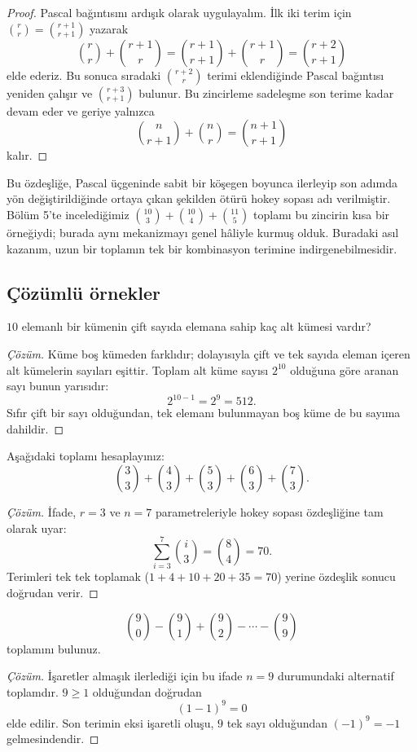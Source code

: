 \begin{proof}
Pascal bağıntısını ardışık olarak uygulayalım. İlk iki terim için $\binom{r}{r}=\binom{r+1}{r+1}$ yazarak
\[
\binom{r}{r}+\binom{r+1}{r}
=\binom{r+1}{r+1}+\binom{r+1}{r}
=\binom{r+2}{r+1}
\]
elde ederiz. Bu sonuca sıradaki $\binom{r+2}{r}$ terimi eklendiğinde Pascal bağıntısı yeniden çalışır ve $\binom{r+3}{r+1}$ bulunur. Bu zincirleme sadeleşme son terime kadar devam eder ve geriye yalnızca
\[
\binom{n}{r+1}+\binom{n}{r}=\binom{n+1}{r+1}
\]
kalır.
\end{proof}

Bu özdeşliğe, Pascal üçgeninde sabit bir köşegen boyunca ilerleyip son adımda yön değiştirildiğinde ortaya çıkan şekilden ötürü hokey sopası adı verilmiştir. Bölüm 5'te incelediğimiz $\binom{10}{3}+\binom{10}{4}+\binom{11}{5}$ toplamı bu zincirin kısa bir örneğiydi; burada aynı mekanizmayı genel hâliyle kurmuş olduk. Buradaki asıl kazanım, uzun bir toplamın tek bir kombinasyon terimine indirgenebilmesidir.

\subsection{Çözümlü örnekler}

\begin{example}
$10$ elemanlı bir kümenin çift sayıda elemana sahip kaç alt kümesi vardır?
\end{example}
\begin{proof}[Çözüm]
Küme boş kümeden farklıdır; dolayısıyla çift ve tek sayıda eleman içeren alt kümelerin sayıları eşittir. Toplam alt küme sayısı $2^{10}$ olduğuna göre aranan sayı bunun yarısıdır:
\[
2^{10-1}=2^9=512.
\]
Sıfır çift bir sayı olduğundan, tek elemanı bulunmayan boş küme de bu sayıma dahildir.
\end{proof}

\begin{example}
Aşağıdaki toplamı hesaplayınız:
\[
\binom{3}{3}+\binom{4}{3}+\binom{5}{3}+\binom{6}{3}+\binom{7}{3}.
\]
\end{example}
\begin{proof}[Çözüm]
İfade, $r=3$ ve $n=7$ parametreleriyle hokey sopası özdeşliğine tam olarak uyar:
\[
\sum_{i=3}^{7}\binom{i}{3}=\binom84=70.
\]
Terimleri tek tek toplamak ($1+4+10+20+35=70$) yerine özdeşlik sonucu doğrudan verir.
\end{proof}

\begin{example}
\[
\binom90-\binom91+\binom92-\cdots-\binom99
\]
toplamını bulunuz.
\end{example}
\begin{proof}[Çözüm]
İşaretler almaşık ilerlediği için bu ifade $n=9$ durumundaki alternatif toplamdır. $9\ge1$ olduğundan doğrudan
\[
(1-1)^9=0
\]
elde edilir. Son terimin eksi işaretli oluşu, $9$ tek sayı olduğundan $(-1)^9=-1$ gelmesindendir.
\end{proof}

